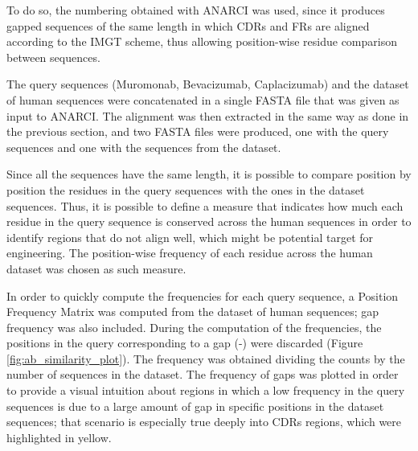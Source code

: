 \documentclass[11pt]{article}
\begin{document}
To do so, the numbering obtained with ANARCI was used, since it produces gapped sequences of the same length in which CDRs and FRs are aligned according to the IMGT scheme, thus allowing position-wise residue comparison between sequences. 

The query sequences (Muromonab, Bevacizumab, Caplacizumab) and the dataset of human sequences were concatenated in a single FASTA file that was given as input to ANARCI. The alignment was then extracted in the same way as done in the previous section, and two FASTA files were produced, one with the query sequences and one with the sequences from the dataset.

Since all the sequences have the same length, it is possible to compare position by position the residues in the query sequences with the ones in the dataset sequences. Thus, it is possible to define a measure that indicates how much each residue in the query sequence is conserved across the human sequences in order to identify regions that do not align well, which might be potential target for engineering. The position-wise frequency of each residue across the human dataset was chosen as such measure. 

In order to quickly compute the frequencies for each query sequence, a Position Frequency Matrix was computed from the dataset of human sequences; gap frequency was also included. During the computation of the frequencies, the positions in the query corresponding to a gap (-) were discarded (Figure \ref{fig:ab_similarity_plot}). The frequency was obtained dividing the counts by the number of sequences in the dataset. The frequency of gaps was plotted in order to provide a visual intuition about regions in which a low frequency in the query sequences is due to a large amount of gap in specific positions in the dataset sequences; that scenario is especially true deeply into CDRs regions, which were highlighted in yellow.
\end{document}

